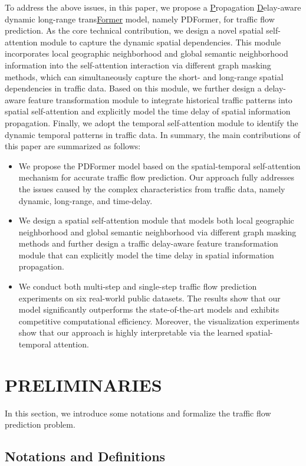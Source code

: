 \documentclass[letterpaper]{article} \usepackage{aaai23}  \usepackage{times}  \usepackage{helvet}  \usepackage{courier}  \usepackage[hyphens]{url}  \usepackage{graphicx} \urlstyle{rm} \def\UrlFont{\rm}  \usepackage{natbib}  \usepackage{caption} \frenchspacing  \setlength{\pdfpagewidth}{8.5in} \setlength{\pdfpageheight}{11in} \usepackage{algorithm}
\newcommand{\name}{PDFormer\xspace}
\begin{document}
To address the above issues, in this paper, we propose a \underline{P}ropagation \underline{D}elay-aware dynamic long-range trans\underline{Former} model, namely \name, for traffic flow prediction. As the core technical contribution, we design a novel spatial self-attention module to capture the dynamic spatial dependencies. This module incorporates local geographic neighborhood and global semantic neighborhood information into the self-attention interaction via different graph masking methods, which can simultaneously capture the short- and long-range spatial dependencies in traffic data. Based on this module, we further design a delay-aware feature transformation module to integrate historical traffic patterns into spatial self-attention and explicitly model the time delay of spatial information propagation. Finally, we adopt the temporal self-attention module to identify the dynamic temporal patterns in traffic data. In summary, the main contributions of this paper are summarized as follows:

\begin{itemize}
\item We propose the \name model based on the spatial-temporal self-attention mechanism for accurate traffic flow prediction. Our approach fully addresses the issues caused by the complex characteristics from traffic data, namely dynamic, long-range, and time-delay. 
\item We design a spatial self-attention module that models both local geographic neighborhood and global semantic neighborhood via different graph masking methods and further design a traffic delay-aware feature transformation module that can explicitly model the time delay in spatial information propagation.
\item We conduct both multi-step and single-step traffic flow prediction experiments on six real-world public datasets. The results show that our model significantly outperforms the state-of-the-art models and exhibits competitive computational efficiency. Moreover, the visualization experiments show that our approach is highly interpretable via the learned spatial-temporal attention.
\end{itemize}

\section{PRELIMINARIES}
In this section, we introduce some notations and formalize the traffic flow prediction problem.
\subsection{Notations and Definitions}
\end{document}
